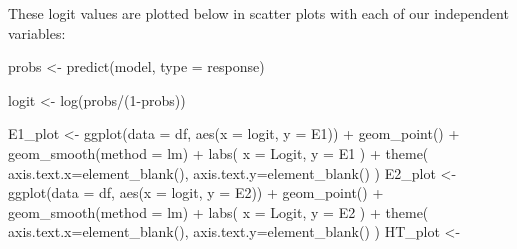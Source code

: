 \documentclass[
]{article}
\newenvironment{Shaded}{\begin{snugshade}}{\end{snugshade}}
\newcommand{\AttributeTok}[1]{\textcolor[rgb]{0.77,0.63,0.00}{#1}}
\newcommand{\DecValTok}[1]{\textcolor[rgb]{0.00,0.00,0.81}{#1}}
\newcommand{\FunctionTok}[1]{\textcolor[rgb]{0.00,0.00,0.00}{#1}}
\newcommand{\NormalTok}[1]{#1}
\newcommand{\OtherTok}[1]{\textcolor[rgb]{0.56,0.35,0.01}{#1}}
\newcommand{\SpecialCharTok}[1]{\textcolor[rgb]{0.00,0.00,0.00}{#1}}
\newcommand{\StringTok}[1]{\textcolor[rgb]{0.31,0.60,0.02}{#1}}
\begin{document}
These logit values are plotted below in scatter plots with each of our
independent variables:

\begin{Shaded}
\begin{Highlighting}[]
\NormalTok{probs }\OtherTok{\textless{}{-}} \FunctionTok{predict}\NormalTok{(model, }\AttributeTok{type =} \StringTok{\textquotesingle{}response\textquotesingle{}}\NormalTok{)}

\NormalTok{logit }\OtherTok{\textless{}{-}} \FunctionTok{log}\NormalTok{(probs}\SpecialCharTok{/}\NormalTok{(}\DecValTok{1}\SpecialCharTok{{-}}\NormalTok{probs))}

\NormalTok{E1\_plot }\OtherTok{\textless{}{-}}
  \FunctionTok{ggplot}\NormalTok{(}\AttributeTok{data =}\NormalTok{ df, }\FunctionTok{aes}\NormalTok{(}\AttributeTok{x =}\NormalTok{ logit, }\AttributeTok{y =}\NormalTok{ E1)) }\SpecialCharTok{+} 
    \FunctionTok{geom\_point}\NormalTok{() }\SpecialCharTok{+}
      \FunctionTok{geom\_smooth}\NormalTok{(}\AttributeTok{method =} \StringTok{\textquotesingle{}lm\textquotesingle{}}\NormalTok{) }\SpecialCharTok{+} 
        \FunctionTok{labs}\NormalTok{(}
          \AttributeTok{x =} \StringTok{\textquotesingle{}Logit\textquotesingle{}}\NormalTok{,}
          \AttributeTok{y =} \StringTok{\textquotesingle{}E1\textquotesingle{}}
\NormalTok{        ) }\SpecialCharTok{+} 
          \FunctionTok{theme}\NormalTok{(}
            \AttributeTok{axis.text.x=}\FunctionTok{element\_blank}\NormalTok{(),}
            \AttributeTok{axis.text.y=}\FunctionTok{element\_blank}\NormalTok{()}
\NormalTok{          )}
\NormalTok{E2\_plot }\OtherTok{\textless{}{-}}
  \FunctionTok{ggplot}\NormalTok{(}\AttributeTok{data =}\NormalTok{ df, }\FunctionTok{aes}\NormalTok{(}\AttributeTok{x =}\NormalTok{ logit, }\AttributeTok{y =}\NormalTok{ E2)) }\SpecialCharTok{+} 
    \FunctionTok{geom\_point}\NormalTok{() }\SpecialCharTok{+}
      \FunctionTok{geom\_smooth}\NormalTok{(}\AttributeTok{method =} \StringTok{\textquotesingle{}lm\textquotesingle{}}\NormalTok{) }\SpecialCharTok{+}         
        \FunctionTok{labs}\NormalTok{(}
          \AttributeTok{x =} \StringTok{\textquotesingle{}Logit\textquotesingle{}}\NormalTok{,}
          \AttributeTok{y =} \StringTok{\textquotesingle{}E2\textquotesingle{}}
\NormalTok{        ) }\SpecialCharTok{+} 
          \FunctionTok{theme}\NormalTok{(}
            \AttributeTok{axis.text.x=}\FunctionTok{element\_blank}\NormalTok{(),}
            \AttributeTok{axis.text.y=}\FunctionTok{element\_blank}\NormalTok{()}
\NormalTok{          )}
\NormalTok{HT\_plot }\OtherTok{\textless{}{-}}

\end{Highlighting}
\end{Shaded}
\end{document}
